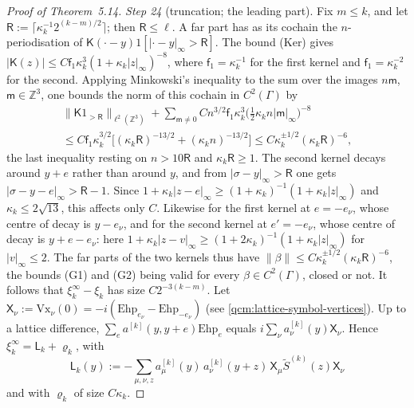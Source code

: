 \documentclass[11pt,letterpaper,reqno]{amsart}
\theoremstyle{definition}
\begin{document}
\begin{proof}[Proof of Theorem~5.14]
\emph{Step 24} (truncation; the leading part).
Fix $m\le k$, and let $\mathsf R:=\lceil\kappa_k^{-1}2^{(k-m)/2}\rceil$; then $\mathsf R\le\ell$.
A far part has as its cochain the $n$-periodisation of $\mathsf K(\cdot-y)1[|\cdot-y|_\infty>\mathsf R]$.
The bound (Ker) gives $|\mathsf K(z)|\le C\mathsf f_1\kappa_k^3(1+\kappa_k|z|_\infty)^{-8}$, where $\mathsf f_1=\kappa_k^{-1}$ for the first kernel and $\mathsf f_1=\kappa_k^{-2}$ for the second.
Applying Minkowski's inequality to the sum over the images $n\mathsf m$, $\mathsf m\in\mathbb Z^3$, one bounds the norm of this cochain in $C^2(\Gamma)$ by
\begin{multline*}
\|\mathsf K1_{>\mathsf R}\|_{\ell^2(\mathbb Z^3)}+\sum_{\mathsf m\ne0}Cn^{3/2}\mathsf f_1\kappa_k^3\bigl(\tfrac12\kappa_kn|\mathsf m|_\infty\bigr)^{-8}\\
\le C\mathsf f_1\kappa_k^{3/2}\bigl[(\kappa_k\mathsf R)^{-13/2}+(\kappa_kn)^{-13/2}\bigr]\le C\kappa_k^{\pm1/2}(\kappa_k\mathsf R)^{-6},
\end{multline*}
the last inequality resting on $n>10\mathsf R$ and $\kappa_k\mathsf R\ge1$.
The second kernel decays around $y+e$ rather than around $y$, and from $|\sigma-y|_\infty>\mathsf R$ one gets $|\sigma-y-e|_\infty>\mathsf R-1$.
Since $1+\kappa_k|z-e|_\infty\ge(1+\kappa_k)^{-1}(1+\kappa_k|z|_\infty)$ and $\kappa_k\le2\sqrt{13}$, this affects only $C$.
Likewise for the first kernel at $e=-e_\nu$, whose centre of decay is $y-e_\nu$, and for the second kernel at $e'=-e_\nu$, whose centre of decay is $y+e-e_\nu$: here $1+\kappa_k|z-v|_\infty\ge(1+2\kappa_k)^{-1}(1+\kappa_k|z|_\infty)$ for $|v|_\infty\le2$.
The far parts of the two kernels thus have $\|\beta\|\le C\kappa_k^{\pm1/2}(\kappa_k\mathsf R)^{-6}$, the bounds (G1) and (G2) being valid for every $\beta\in C^2(\Gamma)$, closed or not.
It follows that $\xi_k^\infty-\xi_k$ has size $C2^{-3(k-m)}$.
Let $\mathsf X_\nu:=\allowbreak \mathrm{Vx}_\nu(0)=\allowbreak -i(\mathrm{Ehp}_{e_\nu}-\mathrm{Ehp}_{-e_\nu})$ (see \eqref{qcm:lattice-symbol-vertices}).
Up to a lattice difference, $\sum_ea^{[k]}(y,y+e)\mathrm{Ehp}_e$ equals $i\sum_\nu a^{[k]}_\nu(y)\mathsf X_\nu$.
Hence $\xi_k^\infty=\mathsf L_k+\varrho_k$, with
\begin{equation*}
\mathsf L_k(y):=-\sum_{\mu,\nu,z}a^{[k]}_\mu(y)\,a^{[k]}_\nu(y+z)\,\mathsf X_\mu\tilde S^{(k)}(z)\mathsf X_\nu
\end{equation*}
and with $\varrho_k$ of size $C\kappa_k$.


\end{proof}
\end{document}
